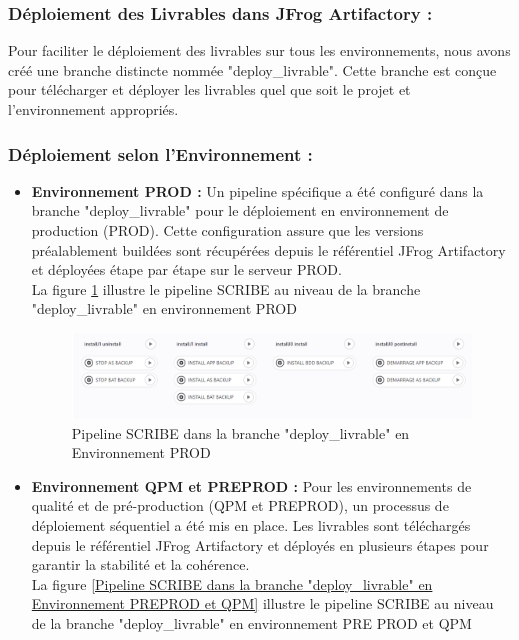 {\subsubsection{Déploiement des Livrables dans JFrog Artifactory :}
Pour faciliter le déploiement des livrables sur tous les environnements, nous avons créé une branche distincte nommée "deploy\_livrable". Cette branche est conçue pour télécharger et déployer les livrables quel que soit le projet et l'environnement appropriés.
\subsubsection{Déploiement selon l'Environnement :}
\begin{itemize}
    \item \textbf{Environnement PROD :} Un pipeline spécifique a été configuré dans la branche "deploy\_livrable" pour le déploiement en environnement de production (PROD). Cette configuration assure que les versions préalablement buildées sont récupérées depuis le référentiel JFrog Artifactory et déployées étape par étape sur le serveur PROD. \\
    La figure \ref{Pipeline SCRIBE dans la branche "deploy_livrable" en Environnement PROD} illustre le pipeline SCRIBE au niveau de la branche "deploy\_livrable" en environnement PROD
\begin{figure}[H]
    \centering\includegraphics[scale=0.55]{img/PROD.PNG}
    \caption{Pipeline SCRIBE dans la branche "deploy\_livrable" en Environnement PROD}
    \label{Pipeline SCRIBE dans la branche "deploy_livrable" en Environnement PROD}
 \end{figure}
 \newpage
 \item \textbf{Environnement QPM et PREPROD :} Pour les environnements de qualité et de pré-production (QPM et PREPROD), un processus de déploiement séquentiel a été mis en place. Les livrables sont téléchargés depuis le référentiel JFrog Artifactory et déployés en plusieurs étapes pour garantir la stabilité et la cohérence. \\
    La figure \ref{Pipeline SCRIBE dans la branche "deploy_livrable" en Environnement PREPROD et QPM} illustre le pipeline SCRIBE au niveau de la branche "deploy\_livrable" en environnement PRE PROD et QPM

\end{itemize}}
